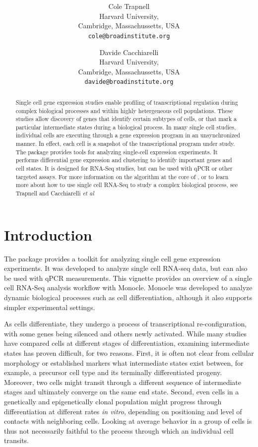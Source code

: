 \documentclass[10pt,oneside]{article}\usepackage[]{graphicx}\usepackage[]{color}
\title{\textsf{\textbf{\thetitle}}}
\author{Cole Trapnell\\[1em]Harvard University,\\ Cambridge, Massachussetts, USA\\
\texttt{cole@broadinstitute.org}}
\author{Davide Cacchiarelli\\[1em]Harvard University,\\ Cambridge, Massachussetts, USA\\
\texttt{davide@broadinstitute.org}}
\begin{document}
\maketitle

\begin{abstract}
Single cell gene expression studies enable profiling of transcriptional regulation during complex biological processes and within highly hetergeneous cell populations. These studies allow discovery of genes that identify certain subtypes of cells, or that mark a particular intermediate states during a biological process. In many single cell studies, individual cells are executing through a gene expression program in an unsynchronized manner. In effect, each cell is a snapshot of the transcriptional program under study. The package  provides tools for analyzing single-cell expression experiments. It performs differential gene expression and clustering to identify important genes and cell states. It is designed for RNA-Seq studies, but can be used with qPCR or other targeted assays. For more information on the algorithm at the core of , or to learn more about how to use single cell RNA-Seq to study a complex biological process, see Trapnell and Cacchiarelli \emph{et al}\cite{TRAPNELL_CACCHIARELLI}
\end{abstract}

\tableofcontents




\section{Introduction}

The  package provides a toolkit for analyzing single cell gene expression experiments. It was developed to analyze single cell RNA-seq data, but can also be used with qPCR measurements. This vignette provides an overview of a single cell RNA-Seq analysis workflow with Monocle. Monocle was developed to analyze dynamic biological processes such as cell differentiation, although it also supports simpler experimental settings.

As cells differentiate, they undergo a process of transcriptional re-configuration, with some genes being silenced and others newly activated. While many studies have compared cells at different stages of differentiation, examining intermediate states has proven difficult, for two reasons.  First, it is often not clear from cellular morphology or established markers what intermediate states exist between, for example, a precursor cell type and its terminally differentiated progeny.  Moreover, two cells might transit through a different sequence of intermediate stages and ultimately converge on the same end state.  Second, even cells in a genetically and epigenetically clonal population might progress through differentiation at different rates \emph{in vitro}, depending on positioning and level of contacts with neighboring cells. Looking at average behavior in a group of cells is thus not necessarily faithful to the process through which an individual cell transits.
\end{document}

